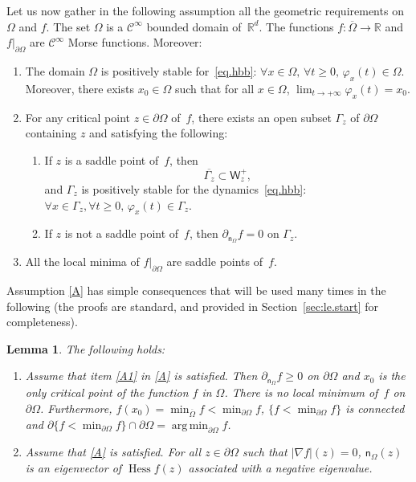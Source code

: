 \documentclass[JEP,XML,SOM,Unicode,NoEqCountersInSection,NoFloatCountersInSection,published]{cedram}
\let\pa\partial
\DeclareMathOperator*{\argmin}{arg\,min}
\DeclareMathOperator{\hess}{Hess}\let\Hess\hess
\theoremstyle{plain}
\newtheorem{lemma}[proposition]{Lemma}
\theoremstyle{definition}
\newenvironment{manualassumption}[1]{%
\renewcommand\themanualassumptioninner{#1}%
\manualassumptioninner}{\endmanualassumptioninner}
\begin{document}
Let us now gather
in the following assumption all the geometric requirements on $\Omega$
and $f$.
\begin{manualassumption}{$(\Omega$-$f)$}\label{A}
The set $\Omega$ is a $\mathcal C^\infty$ bounded domain of~$\mathbb R^d$. The functions \hbox{$f:\overline \Omega\to \mathbb R$} and $f|_{\partial \Omega}$
are $\mathcal C^\infty$ Morse functions. Moreover:
\begin{enumerate}
\item\label{A1}
The domain $\Omega$ is positively stable for~\eqref{eq.hbb}:
$\forall x\in \Omega, \, \forall t\ge 0, \, \varphi_x(t)\in
\Omega$. Moreover, there exists $x_0\in \Omega$ such that for all $x\in \Omega$, $\lim_{t\to +\infty}\varphi_x(t)=x_0$.

\item\label{A2}
For any critical point $z\in \partial \Omega$ of~$f$, there exists an open
subset $\Gamma_z$ of $\partial
\Omega$ containing $z$ and satisfying the following:
\begin{enumerate}
\item\label{A2a}
If $z$ is a saddle point of~$f$, then
\begin{equation}\label{eq.incluWW}
\overline{\Gamma_{z} }\subset \mathsf W_z^+,
\end{equation}
and $\Gamma_z$ is positively stable for the
dynamics~\eqref{eq.hbb}: $\forall x\in \Gamma_{z}, \forall t\ge 0,
\, \varphi_x(t)\in \Gamma_{z}$.

\item\label{A2b}
If $z$ is not a saddle point of~$f$, then $\partial_{\mathsf n_\Omega} f=0$ on $\Gamma_z$.
\end{enumerate}

\item\label{A3}
All the local minima of $f|_{\partial \Omega}$ are saddle points of~$f$.
\end{enumerate}
\end{manualassumption}

Assumption \ref{A} has simple consequences that will be used
many times in the following (the proofs are standard, and provided in
Section~\ref{sec:le.start} for completeness).

\begin{lemma}\label{le.start}
The following holds:
\begin{enumerate}
\item\label{le.start1}
Assume that item \eqref{A1} in \ref{A} is satisfied. Then $\partial_{\mathsf n_\Omega}f\ge 0$ on $\partial \Omega$ and $x_0$ is the only critical point of the function $f$ in $\Omega$. There is no local minimum of~$f$ on $\partial \Omega$. Furthermore,
$f(x_0)=\min_{\overline \Omega}f<\min_{\partial \Omega}f$, $\{f< \min_{\partial \Omega}f\}$ is connected and $\pa \{f< \min_{\partial \Omega}f\}\cap \partial \Omega =\argmin_{\partial \Omega}f$.

\item\label{le.start2}
Assume that \ref{A} is satisfied. For all $z\in \partial \Omega$ such that $\vert \nabla f\vert (z)=0$, $\mathsf n_\Omega(z)$ is an eigenvector of $\hess f(z)$ associated with a negative eigenvalue.
\end{enumerate}
\end{lemma}
\end{document}
